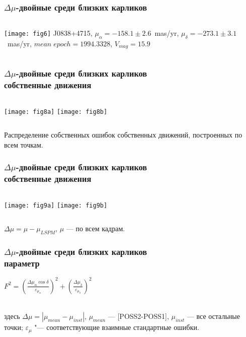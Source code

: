 \begin{frame}%
\frametitle{$\Delta\mu$-двойные среди близких карликов}
\begin{columns}
	\texttt{[image: fig6]}
	{\footnotesize
		J0838+4715, $\mu_{\alpha}=-158.1\pm2.6$~mas/yr, $\mu_{\delta}=-273.1\pm3.1$~mas/yr, $mean\;epoch = 1994.3328$, $V_{mag}=15.9$
	}
\end{columns}
\end{frame}


\begin{frame}%
\frametitle{$\Delta\mu$-двойные среди близких карликов\\{\small собственные движения}}
\begin{center}
\begin{columns}
	\texttt{[image: fig8a]}
	\texttt{[image: fig8b]}
\end{columns}
\end{center}
{\footnotesize Распределение собственных ошибок собственных движений, построенных по всем точкам.}
\end{frame}


\begin{frame}%
\frametitle{$\Delta\mu$-двойные среди близких карликов\\{\small собственные движения}}
\begin{center}
\begin{columns}
	\texttt{[image: fig9a]}
	\texttt{[image: fig9b]}
\end{columns}
\end{center}
{\footnotesize $\Delta \mu = \mu - \mu_{LSPM}$, $\mu$ --- по всем кадрам.}
\end{frame}


\begin{frame}
\frametitle{$\Delta\mu$-двойные среди близких карликов\\{\small параметр}}
\begin{center}
$F^2=\left(\frac{\Delta\mu_\alpha\cos\delta}{\varepsilon_{\mu_\alpha}}\right)^2 + \left(\frac{\Delta\mu_\delta}{\varepsilon_{\mu_\delta}}\right)^2$\\ \\
\end{center}
{\footnotesize
здесь $\Delta\mu = |\mu_{mean}-\mu_{inst}|$,  $\mu_{mean}$ --- [POSS2-POSS1], $\mu_{inst}$ --- все остальные точки; $\varepsilon_{\mu}$ "--- соответствующие взаимные стандартные ошибки.
}
\end{frame}


